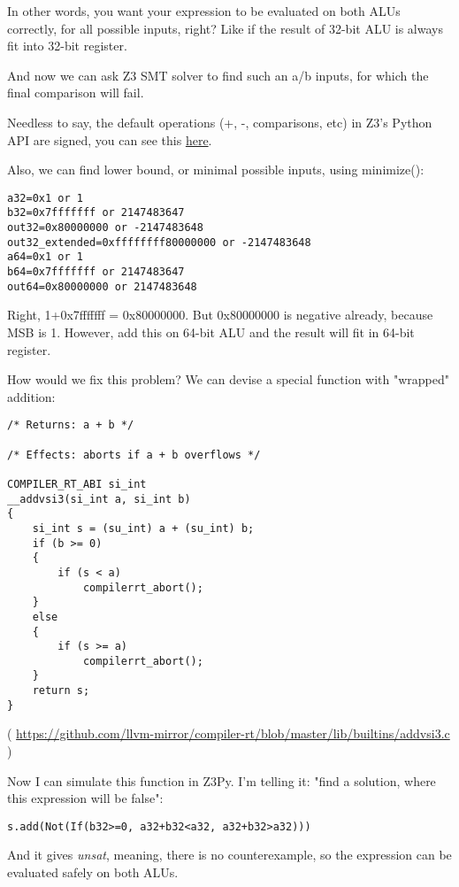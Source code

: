 In other words, you want your expression to be evaluated on both ALUs correctly, for all possible inputs, right?
Like if the result of 32-bit ALU is always fit into 32-bit register.

And now we can ask Z3 SMT solver to find such an a/b inputs, for which the final comparison will fail.

Needless to say, the default operations (+, -, comparisons, etc) in Z3's Python API are signed, you can see this 
\href{https://github.com/Z3Prover/z3/blob/master/src/api/python/z3/z3.py}{here}.

Also, we can find lower bound, or minimal possible inputs, using minimize():



\begin{lstlisting}
a32=0x1 or 1
b32=0x7fffffff or 2147483647
out32=0x80000000 or -2147483648
out32_extended=0xffffffff80000000 or -2147483648
a64=0x1 or 1
b64=0x7fffffff or 2147483647
out64=0x80000000 or 2147483648
\end{lstlisting}

Right, 1+0x7fffffff = 0x80000000.
But 0x80000000 is negative already, because \ac{MSB} is 1.
However, add this on 64-bit \ac{ALU} and the result will fit in 64-bit register.

How would we fix this problem?
We can devise a special function with "wrapped" addition:

\begin{lstlisting}[style=customc]
/* Returns: a + b */

/* Effects: aborts if a + b overflows */

COMPILER_RT_ABI si_int
__addvsi3(si_int a, si_int b)
{
    si_int s = (su_int) a + (su_int) b;
    if (b >= 0)
    {
        if (s < a)
            compilerrt_abort();
    }
    else
    {
        if (s >= a)
            compilerrt_abort();
    }
    return s;
}
\end{lstlisting}

( \url{https://github.com/llvm-mirror/compiler-rt/blob/master/lib/builtins/addvsi3.c} )

Now I can simulate this function in Z3Py.
I'm telling it: "find a solution, where this expression will be false":

\begin{lstlisting}
s.add(Not(If(b32>=0, a32+b32<a32, a32+b32>a32)))
\end{lstlisting}

And it gives \textit{unsat}, meaning, there is no counterexample, so the expression can be evaluated safely on both \ac{ALU}s.

